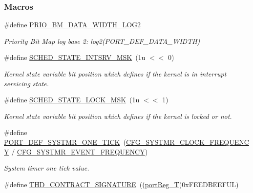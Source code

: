 \subsubsection*{Macros}
\begin{DoxyCompactItemize}
\item 
\#define \hyperlink{group__kern__impl_ga4a1ac440197aa9f2d77edf92c5b3b83c}{P\-R\-I\-O\-\_\-\-B\-M\-\_\-\-D\-A\-T\-A\-\_\-\-W\-I\-D\-T\-H\-\_\-\-L\-O\-G2}
\begin{DoxyCompactList}\small\item\em Priority Bit Map log base 2\-: {\ttfamily log2(\-P\-O\-R\-T\-\_\-\-D\-E\-F\-\_\-\-D\-A\-T\-A\-\_\-\-W\-I\-D\-T\-H)} \end{DoxyCompactList}\item 
\#define \hyperlink{group__kern__impl_ga11143896be344ab4dd20f6eb690918e7}{S\-C\-H\-E\-D\-\_\-\-S\-T\-A\-T\-E\-\_\-\-I\-N\-T\-S\-R\-V\-\_\-\-M\-S\-K}~(1u $<$$<$ 0)
\begin{DoxyCompactList}\small\item\em Kernel state variable bit position which defines if the kernel is in interrupt servicing state. \end{DoxyCompactList}\item 
\#define \hyperlink{group__kern__impl_gaf22f5679cd32d7dca7986d48b438b374}{S\-C\-H\-E\-D\-\_\-\-S\-T\-A\-T\-E\-\_\-\-L\-O\-C\-K\-\_\-\-M\-S\-K}~(1u $<$$<$ 1)
\begin{DoxyCompactList}\small\item\em Kernel state variable bit position which defines if the kernel is locked or not. \end{DoxyCompactList}\item 
\#define \hyperlink{group__kern__impl_ga9b9c4658370f93af1dc12ff6fda1f747}{P\-O\-R\-T\-\_\-\-D\-E\-F\-\_\-\-S\-Y\-S\-T\-M\-R\-\_\-\-O\-N\-E\-\_\-\-T\-I\-C\-K}~(\hyperlink{group__template__cpu__cfg_gac85c592962ba2c968d13f867533196a1}{C\-F\-G\-\_\-\-S\-Y\-S\-T\-M\-R\-\_\-\-C\-L\-O\-C\-K\-\_\-\-F\-R\-E\-Q\-U\-E\-N\-C\-Y} / \hyperlink{group__template__kern__cfg_ga4e46164ae5a37bfc54c67b6f01d93eb1}{C\-F\-G\-\_\-\-S\-Y\-S\-T\-M\-R\-\_\-\-E\-V\-E\-N\-T\-\_\-\-F\-R\-E\-Q\-U\-E\-N\-C\-Y})
\begin{DoxyCompactList}\small\item\em System timer one tick value. \end{DoxyCompactList}\item 
\#define \hyperlink{group__kern__impl_ga5fa3cbd45a4d6d49ec0018de3165ff6a}{T\-H\-D\-\_\-\-C\-O\-N\-T\-R\-A\-C\-T\-\_\-\-S\-I\-G\-N\-A\-T\-U\-R\-E}~((\hyperlink{group__template__cpu__intf_ga99980ab56ce9857e7380210d12e3d41f}{port\-Reg\-\_\-\-T})0x\-F\-E\-E\-D\-B\-E\-E\-F\-U\-L)

\end{DoxyCompactItemize}
